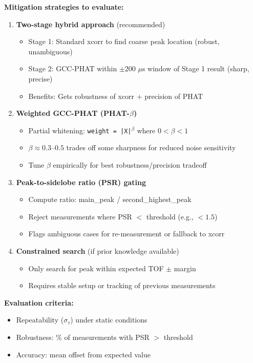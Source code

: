 \documentclass[11pt]{article}
\begin{document}
\textbf{Mitigation strategies to evaluate:}

\begin{enumerate}
    \item \textbf{Two-stage hybrid approach} (recommended)
    \begin{itemize}
        \item Stage 1: Standard xcorr to find coarse peak location (robust, unambiguous)
        \item Stage 2: GCC-PHAT within $\pm$200 $\mu$s window of Stage 1 result (sharp, precise)
        \item Benefits: Gets robustness of xcorr + precision of PHAT
    \end{itemize}

    \item \textbf{Weighted GCC-PHAT (PHAT-$\beta$)}
    \begin{itemize}
        \item Partial whitening: \texttt{weight = |X|$^\beta$} where $0 < \beta < 1$
        \item $\beta \approx 0.3$--$0.5$ trades off some sharpness for reduced noise sensitivity
        \item Tune $\beta$ empirically for best robustness/precision tradeoff
    \end{itemize}

    \item \textbf{Peak-to-sidelobe ratio (PSR) gating}
    \begin{itemize}
        \item Compute ratio: main\_peak / second\_highest\_peak
        \item Reject measurements where PSR $<$ threshold (e.g., $< 1.5$)
        \item Flags ambiguous cases for re-measurement or fallback to xcorr
    \end{itemize}

    \item \textbf{Constrained search} (if prior knowledge available)
    \begin{itemize}
        \item Only search for peak within expected TOF $\pm$ margin
        \item Requires stable setup or tracking of previous measurements
    \end{itemize}
\end{enumerate}

\textbf{Evaluation criteria:}
\begin{itemize}
    \item Repeatability ($\sigma_\tau$) under static conditions
    \item Robustness: \% of measurements with PSR $>$ threshold
    \item Accuracy: mean offset from expected value
\end{itemize}
\end{document}
